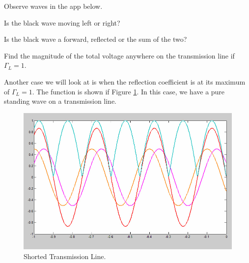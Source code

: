 \documentclass{ximera}
\begin{document}
\begin{question}

Observe waves in the app below. 


\begin{center}  
\end{center} 


Is the black wave moving left or right? 

\begin{multipleChoice}  
\end{multipleChoice}  


Is the black wave a forward, reflected or the sum of the two?
\begin{multipleChoice}  
\end{multipleChoice}  

\end{question}


\begin{example}

Find the magnitude of the total voltage anywhere on the transmission line if $\Gamma_L=1$.

\begin{explanation}
Another case we will look at is when 
the reflection coefficient is at its maximum of $\Gamma_L =1$. The
function is shown if Figure \ref{fig:SWStanding}. In this case, we have a pure standing wave on a transmission line.


\begin{figure}[htbp]
\begin{center}
\includegraphics[scale=0.3]{../jpg/shortedline.jpg}
\end{center}
\caption{Shorted Transmission Line.}
\label{fig:SWStanding}
\end{figure}

\end{explanation}
\end{example}
\end{document}
